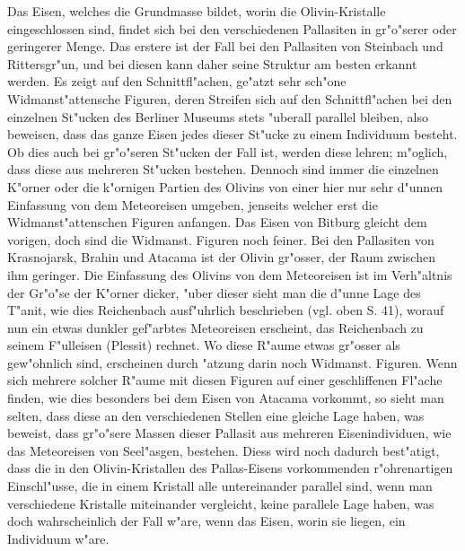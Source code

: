 \documentclass[a4paper, 11pt, oneside, german]{article}
\begin{document}
Das Eisen, welches die Grundmasse bildet, worin die Olivin-Kristalle eingeschlossen sind, findet sich bei den verschiedenen Pallasiten in gr"o"serer oder geringerer Menge. Das erstere ist der Fall bei den Pallasiten von Steinbach und Rittersgr"un, und bei diesen kann daher seine Struktur am besten erkannt werden. Es zeigt auf den Schnittfl"achen, ge"atzt sehr sch"one Widmanst"attensche Figuren, deren Streifen sich auf den Schnittfl"achen bei den einzelnen St"ucken des Berliner Museums stets "uberall parallel bleiben, also beweisen, dass das ganze Eisen jedes dieser St"ucke zu einem Individuum besteht. Ob dies auch bei gr"o"seren St"ucken der Fall ist, werden diese lehren; m"oglich, dass diese aus mehreren St"ucken bestehen. Dennoch sind immer die einzelnen K"orner oder die k"ornigen Partien des Olivins von einer hier nur sehr d"unnen Einfassung von dem Meteoreisen umgeben, jenseits welcher erst die Widmanst"attenschen Figuren anfangen. Das Eisen von Bitburg gleicht dem vorigen, doch sind die Widmanst. Figuren noch feiner. Bei den Pallasiten von Krasnojarsk, Brahin und Atacama ist der Olivin gr"osser, der Raum zwischen ihm geringer. Die Einfassung des Olivins von dem Meteoreisen ist im Verh"altnis der Gr"o"se der K"orner dicker, "uber dieser sieht man die d"unne Lage des T"anit, wie dies Reichenbach ausf"uhrlich beschrieben (vgl. oben S. 41), worauf nun ein etwas dunkler gef"arbtes Meteoreisen erscheint, das Reichenbach zu seinem F"ulleisen (Plessit) rechnet. Wo diese R"aume etwas gr"osser als gew"ohnlich sind, erscheinen durch "atzung darin noch Widmanst. Figuren. Wenn sich mehrere solcher R"aume mit diesen Figuren auf einer geschliffenen Fl"ache finden, wie dies besonders bei dem Eisen von Atacama vorkommt, so sieht man selten, dass diese an den verschiedenen Stellen eine gleiche Lage haben, was beweist, dass gr"o"sere Massen dieser Pallasit aus mehreren Eisenindividuen, wie das Meteoreisen von Seel"asgen, bestehen. Diess wird noch dadurch best"atigt, dass die in den Olivin-Kristallen des Pallas-Eisens vorkommenden r"ohrenartigen Einschl"usse, die in einem Kristall alle untereinander parallel sind, wenn man verschiedene Kristalle miteinander vergleicht, keine parallele Lage haben, was doch wahrscheinlich der Fall w"are, wenn das Eisen, worin sie liegen, ein Individuum w"are.
\end{document}
